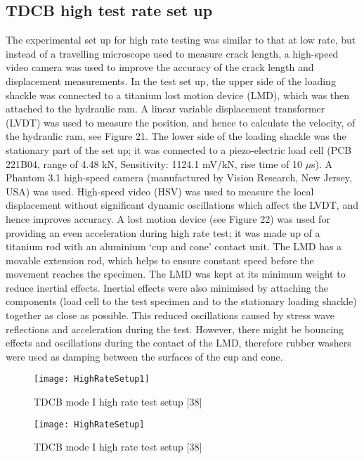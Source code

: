 \documentclass[numbers=noendperiod,chapterprefix=on]{icldt} %
\begin{document}
\subsection{TDCB high test rate set up}
The experimental set up for high rate testing was similar to that at low rate, but instead of a travelling microscope used to measure crack length, a high-speed video camera was used to improve the accuracy of the crack length and displacement measurements. 
In the test set up, the upper side of the loading shackle was connected to a titanium lost motion device (LMD), which was then attached to the hydraulic ram. A linear variable displacement transformer (LVDT) was used to measure the position, and hence to calculate the velocity, of the hydraulic ram, see Figure 21. 
The lower side of the loading shackle was the stationary part of the set up; it was connected to a piezo-electric load cell (PCB 221B04, range of 4.48 kN, Sensitivity: 1124.1 mV/kN, rise time of 10 $\mu$s). A Phantom 3.1 high-speed camera (manufactured by Vision Research, New Jersey, USA) was used. High-speed video (HSV) was used to measure the local displacement without significant dynamic oscillations which affect the LVDT, and hence improves accuracy.
A lost motion device (see Figure 22) was used for providing an even acceleration during high rate test; it was made up of a titanium rod with an aluminium ‘cup and cone’ contact unit. The LMD has a movable extension rod, which helps to ensure constant speed before the movement reaches the specimen. The LMD was kept at its minimum weight to reduce inertial effects. Inertial effects were also minimised by attaching the components (load cell to the test specimen and to the stationary loading shackle) together as close as possible. This reduced oscillations caused by stress wave reflections and acceleration during the test. However, there might be bouncing effects and oscillations during the contact of the LMD, therefore rubber washers were used as damping between the surfaces of the cup and cone.

\begin{figure}[!htpb]
\centering
\texttt{[image: HighRateSetup1]}
\caption{TDCB mode I high rate test setup [38]} %
\end{figure}

\begin{figure}[!htpb]
\centering
\texttt{[image: HighRateSetup]}
\caption{TDCB mode I high rate test setup [38]} %
\end{figure}
\end{document}
